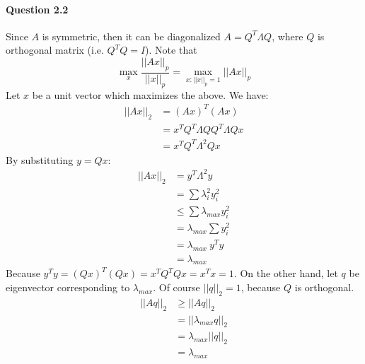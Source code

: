 \paragraph{Question 2.2}
Since $A$ is symmetric, then it can be diagonalized $A=Q^T\Lambda Q$, where $Q$ is orthogonal matrix (i.e. $Q^T Q = I $).
Note that 
\begin{equation*}
    \max_{x} \frac{||Ax||_p}{||x||_p} = \max_{x: ||x||_p = 1} ||Ax||_p
\end{equation*}
Let $x$ be a unit vector which maximizes the above.
We have:
\begin{align*}
    ||Ax||_2 &= (Ax)^T (Ax) \\
            &= x^T Q^T \Lambda Q Q^T \Lambda Q x \\
            &= x^T Q^T \Lambda^2 Q x
\end{align*}
By substituting $y = Qx$:
\begin{align*}
    ||Ax||_2 &= y^T \Lambda^2 y \\
            &= \sum \lambda_i^2 y_i^2 \\
            &\leq \sum \lambda_{max} y_i^2  \\
            &=\lambda_{max} \sum  y_i^2  \\
            &= \lambda_{max} \: y^T  y \\
            &= \lambda_{max}
\end{align*}
Because $y^T y = (Qx)^T(Qx) = x^T Q^T Q x = x^T x = 1$.
On the other hand, let $q$ be eigenvector corresponding to $\lambda_{max}$.
Of course $||q||_2 =1$, because $Q$ is orthogonal.
\begin{align*}
    ||Aq||_2 &\geq ||Aq||_2 \\
            &= ||\lambda_{max} q ||_2 \\
            &= \lambda_{max} ||q||_2 \\
            &= \lambda_{max}
\end{align*}




